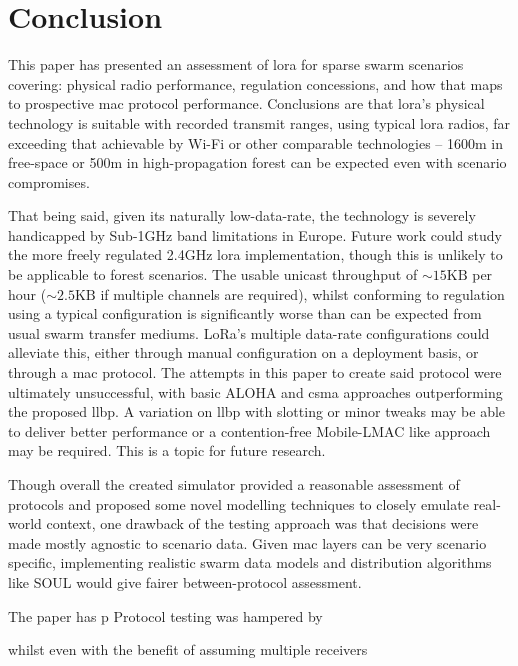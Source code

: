 \chapter{Conclusion}
This paper has presented an assessment of \ac{lora} for sparse swarm scenarios covering: physical radio performance, regulation concessions, and how that maps to prospective \ac{mac} protocol performance. Conclusions are that \ac{lora}'s physical technology is suitable with recorded transmit ranges, using typical \ac{lora} radios, far exceeding that achievable by Wi-Fi or other comparable technologies -- 1600m in free-space or 500m in high-propagation forest can be expected even with scenario compromises. 

That being said, given its naturally low-data-rate, the technology is severely handicapped by Sub-1GHz band limitations in Europe. Future work could study the more freely regulated 2.4GHz \ac{lora} implementation, though this is unlikely to be applicable to forest scenarios. The usable unicast throughput of ${\sim}15\text{KB}$ per hour (${\sim}2.5\text{KB}$ if multiple channels are required),  whilst conforming to regulation using a typical configuration is significantly worse than can be expected from usual swarm transfer mediums. LoRa's multiple data-rate configurations could alleviate this, either through manual configuration on a deployment basis, or through a \ac{mac} protocol. The attempts in this paper to create said protocol were ultimately unsuccessful, with basic ALOHA and \ac{csma} approaches outperforming the proposed \ac{llbp}. A variation on \ac{llbp} with slotting or minor tweaks may be able to deliver better performance or a contention-free Mobile-LMAC \cite{3YP:WSN_BOOK} like approach may be required. This is a topic for future research.

Though overall the created simulator provided a reasonable assessment of protocols and proposed some novel modelling techniques to closely emulate real-world context, one drawback of the testing approach was that decisions were made mostly agnostic to scenario data. Given \ac{mac} layers can be very scenario specific, implementing realistic swarm data models and distribution algorithms like SOUL \cite{3YP:SOUL} would give fairer between-protocol assessment. 


The paper has p 
 Protocol testing was hampered by 



whilst  
even with the benefit of assuming multiple receivers



